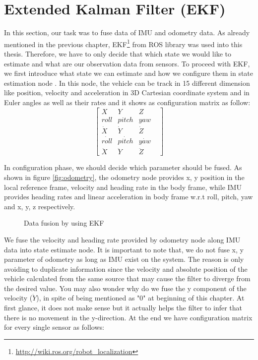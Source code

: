 \section{Extended Kalman Filter (EKF)}
In this section, our task was to fuse data of IMU and odometry data. As already mentioned in the previous chapter, EKF\footnote{\url{http://wiki.ros.org/robot_localization}} from ROS library was used into this thesis. Therefore, we have to only decide that which state we would like to estimate and what are our observation data from sensors. To proceed with EKF, we first introduce what state we can estimate and how we configure them in state estimation node \cite{kalman7}. In this node, the vehicle can be track in 15 different dimension like position, velocity and acceleration in 3D Cartesian coordinate system and in Euler angles as well as their rates and it shows as configuration matrix as follow:
\begin{equation*}\label{eq:state}
 \begin{bmatrix}
X & Y &Z\\
roll& pitch& yaw&\\
\dot X & \dot Y& \dot Z\\
\dot {roll} & \dot {pitch}& \dot {yaw}\\
\ddot X & \ddot Y& \ddot Z
\end{bmatrix}   
\end{equation*}
\par In configuration phase, we should decide which parameter should be fused. As shown in figure \ref{fig:odometry}, the odometry node provides x, y position in the local reference frame, velocity and heading rate in the body frame, while IMU provides heading rates and linear acceleration in body frame w.r.t roll, pitch, yaw and x, y, z respectively.
\begin{figure}[H]
    \centering
    \caption{Data fusion by using EKF}
    \label{fig:ekf_node}
\end{figure}
We fuse the velocity and heading rate provided by odometry node along IMU data into state estimate node. It is important to note that, we do not fuse x, y parameter of odometry as long as IMU exist on the system. The reason is only avoiding to duplicate information since the velocity and absolute position of the vehicle calculated from the same source that may cause the filter to diverge from the desired value. You may also wonder why do we fuse the y component of the velocity ($\dot Y$), in spite of being mentioned as "0" at beginning of this chapter. At first glance, it does not make sense but it actually helps the filter to infer that there is no movement in the y-direction. At the end we have configuration matrix for every single sensor as follows:

